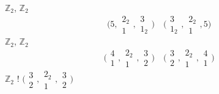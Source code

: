 \documentclass[11pt,a4paper]{article}
\begin{document}

 \quad $\mathbb{Z}_2$, $\mathbb{Z}_2$
\[
  \bigl(5, \begin{smallmatrix}2_2\\1\end{smallmatrix}, \begin{smallmatrix}3\\1_2\end{smallmatrix}\bigr) \quad
  \bigl(\begin{smallmatrix}3\\1_2\end{smallmatrix}, \begin{smallmatrix}2_2\\1\end{smallmatrix}, 5\bigr)
\]
 \quad $\mathbb{Z}_2$, $\mathbb{Z}_2$
\[
  \bigl(\begin{smallmatrix}4\\1\end{smallmatrix}, \begin{smallmatrix}2_2\\1\end{smallmatrix}, \begin{smallmatrix}3\\2\end{smallmatrix}\bigr) \quad
  \bigl(\begin{smallmatrix}3\\2\end{smallmatrix}, \begin{smallmatrix}2_2\\1\end{smallmatrix}, \begin{smallmatrix}4\\1\end{smallmatrix}\bigr)
\]
 \quad $\mathbb{Z}_2$ ! \quad $\bigl(\begin{smallmatrix}3\\2\end{smallmatrix}, \begin{smallmatrix}2_2\\1\end{smallmatrix}, \begin{smallmatrix}3\\2\end{smallmatrix}\bigr)$
\end{document}
